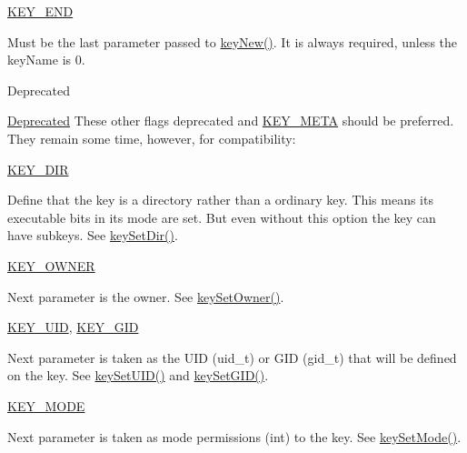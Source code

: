 \begin{DoxyItemize}
\item \hyperlink{group__key_gga91fb3178848bd682000958089abbaf40aa8adb6fcb92dec58fb19410eacfdd403}{K\-E\-Y\-\_\-\-E\-N\-D} \par
 Must be the last parameter passed to \hyperlink{group__key_gad23c65b44bf48d773759e1f9a4d43b89}{key\-New()}. It is always required, unless the {\ttfamily key\-Name} is 0.
\end{DoxyItemize}

\begin{DoxyRefDesc}{Deprecated}
\item[\hyperlink{deprecated__deprecated000002}{Deprecated}]These other flags deprecated and \hyperlink{group__key_gga91fb3178848bd682000958089abbaf40a040582834bb2d90049947d7ef74e87e2}{K\-E\-Y\-\_\-\-M\-E\-T\-A} should be preferred. They remain some time, however, for compatibility\-:
\begin{DoxyItemize}
\item \hyperlink{group__key_gga91fb3178848bd682000958089abbaf40a9e43e47c8a21478538e2d20e049981d5}{K\-E\-Y\-\_\-\-D\-I\-R} \par
 Define that the key is a directory rather than a ordinary key. This means its executable bits in its mode are set. But even without this option the key can have subkeys. See \hyperlink{group__keymeta_gaae575bd86a628a15ee45baa860522e75}{key\-Set\-Dir()}.
\item \hyperlink{group__key_gga91fb3178848bd682000958089abbaf40a77ca60362fa8daca8d5347db4385068b}{K\-E\-Y\-\_\-\-O\-W\-N\-E\-R} \par
 Next parameter is the owner. See \hyperlink{group__keyname_ga88d6ec200ba0707b7c1b4a88133d2be4}{key\-Set\-Owner()}.
\item \hyperlink{group__key_gga91fb3178848bd682000958089abbaf40a28f01a87d65f065172f734c9c9446c0e}{K\-E\-Y\-\_\-\-U\-I\-D}, \hyperlink{group__key_gga91fb3178848bd682000958089abbaf40ac0628bbaba7c837ca73323681393d15f}{K\-E\-Y\-\_\-\-G\-I\-D} \par
 Next parameter is taken as the U\-I\-D (uid\-\_\-t) or G\-I\-D (gid\-\_\-t) that will be defined on the key. See \hyperlink{group__keymeta_gab5f284f5ecd261e0a290095f50ba1af7}{key\-Set\-U\-I\-D()} and \hyperlink{group__keymeta_ga9e3d0fb3f7ba906e067727b9155d22e3}{key\-Set\-G\-I\-D()}.
\item \hyperlink{group__key_gga91fb3178848bd682000958089abbaf40a1b0a91ff3a855d6993930ebf0abaa518}{K\-E\-Y\-\_\-\-M\-O\-D\-E} \par
 Next parameter is taken as mode permissions (int) to the key. See \hyperlink{group__keymeta_ga8803037e35b9da1ce492323a88ff6bc3}{key\-Set\-Mode()}. 

\end{DoxyItemize}
\end{DoxyRefDesc}

